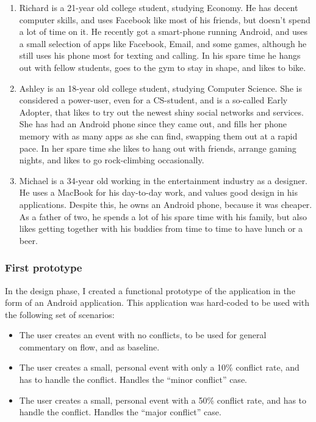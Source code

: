\documentclass[a4paper,11pt]{report}
\begin{document}
\begin{enumerate}
\item Richard is a 21-year old college student, studying Economy. He has decent
  computer skills, and uses Facebook like most of his friends, but doesn't spend
  a lot of time on it. He recently got a smart-phone running Android, and uses a
  small selection of apps like Facebook, Email, and some games, although he
  still uses his phone most for texting and calling. In his spare time he hangs
  out with fellow students, goes to the gym to stay in shape, and likes to bike.
\item Ashley is an 18-year old college student, studying Computer Science. She
  is considered a power-user, even for a CS-student, and is a so-called Early
  Adopter, that likes to try out the newest shiny social networks and
  services. She has had an Android phone since they came out, and fills her
  phone memory with as many apps as she can find, swapping them out at a rapid
  pace. In her spare time she likes to hang out with friends, arrange gaming
  nights, and likes to go rock-climbing occasionally.
\item Michael is a 34-year old working in the entertainment industry as a
  designer. He uses a MacBook for his day-to-day work, and values good design in
  his applications. Despite this, he owns an Android phone, because it was
  cheaper. As a father of two, he spends a lot of his spare time with his
  family, but also likes getting together with his buddies from time to time to
  have lunch or a beer.
\end{enumerate}

\subsubsection{First prototype}

In the design phase, I created a functional prototype of the application in the
form of an Android application. This application was hard-coded to be used with
the following set of scenarios:

\begin{itemize}
\item The user creates an event with no conflicts, to be used for general
  commentary on flow, and as baseline.
\item The user creates a small, personal event with only a 10\% conflict rate,
  and has to handle the conflict. Handles the ``minor conflict'' case.
\item The user creates a small, personal event with a 50\% conflict rate, and
  has to handle the conflict. Handles the ``major conflict'' case.
\end{itemize}
\end{document}
